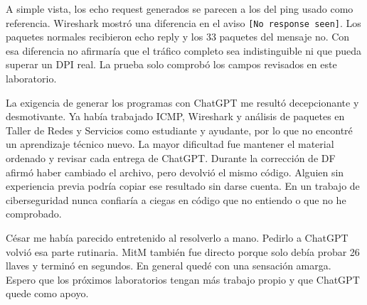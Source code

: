 \documentclass[letterpaper,12pt]{article}
\begin{document}
A simple vista, los echo request generados se parecen a los del ping usado como referencia. Wireshark mostró una diferencia en el aviso \texttt{[No response seen]}. Los paquetes normales recibieron echo reply y los 33 paquetes del mensaje no. Con esa diferencia no afirmaría que el tráfico completo sea indistinguible ni que pueda superar un DPI real. La prueba solo comprobó los campos revisados en este laboratorio.

La exigencia de generar los programas con ChatGPT me resultó decepcionante y desmotivante. Ya había trabajado ICMP, Wireshark y análisis de paquetes en Taller de Redes y Servicios como estudiante y ayudante, por lo que no encontré un aprendizaje técnico nuevo. La mayor dificultad fue mantener el material ordenado y revisar cada entrega de ChatGPT. Durante la corrección de DF afirmó haber cambiado el archivo, pero devolvió el mismo código. Alguien sin experiencia previa podría copiar ese resultado sin darse cuenta. En un trabajo de ciberseguridad nunca confiaría a ciegas en código que no entiendo o que no he comprobado.

César me había parecido entretenido al resolverlo a mano. Pedirlo a ChatGPT volvió esa parte rutinaria. MitM también fue directo porque solo debía probar 26 llaves y terminó en segundos. En general quedé con una sensación amarga. Espero que los próximos laboratorios tengan más trabajo propio y que ChatGPT quede como apoyo.
\end{document}
